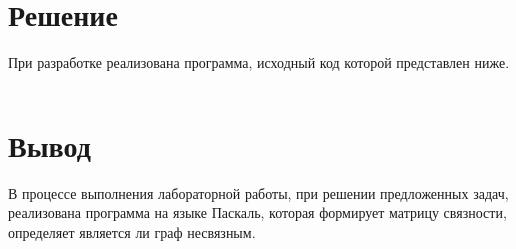 \documentclass[a4paper,14pt]{extarticle}
\begin{document}
  \section*{\hspace{12.5mm}Решение}

  \pagebreak
  При разработке реализована программа, исходный код которой представлен ниже.

  \begingroup
    \linespread{1}

    \begin{Verbatim}[tabsize=2]

    \end{Verbatim}
  \endgroup

  \section*{\hspace{12.5mm}Вывод}
  В процессе выполнения лабораторной работы, при решении предложенных задач, реализована программа на языке Паскаль, которая формирует матрицу связности, определяет является ли граф несвязным.
\end{document}
